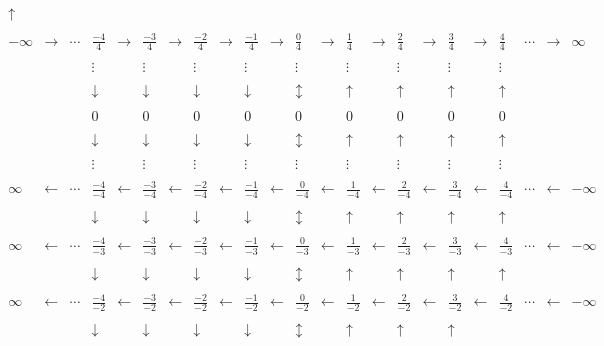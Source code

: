 \documentclass [12pt]{book}
\begin{document}
\begin{eqnarray}
\begin{array}{rrrrrrrrrrrrrrrrrrrrrrrrrrrrrrrrrrrrrrrrrrrrrrrrrrrrrrrrrrrrrrrrrrrrrrrrrrrrrrrr}
\uparrow&&& \\\\-\infty&\rightarrow&\cdots & \frac{-4}{4}&\rightarrow & \frac{-3}{4}&\rightarrow  & \frac{-2}{4}&\rightarrow  & \frac{-1}{4}&\rightarrow  & \frac{0}{4}&\rightarrow   & \frac{1}{4} &\rightarrow & \frac{2}{4}&\rightarrow  & \frac{3}{4}&\rightarrow  & \frac{4}{4} &\cdots&\rightarrow &\infty
\\\\&&&\vdots & &\vdots & & \vdots & & \vdots  && \vdots  && \vdots && \vdots && \vdots && \vdots & & &\\\\&&&\downarrow&& \downarrow&&\downarrow&& \downarrow&&\updownarrow&&\uparrow &&\uparrow&&\uparrow&&
\uparrow&&& \\\\
&&& 0&& 0&& 0&& 0&& 0 && 0&& 0&&0&&0&&&\\\\&&&\downarrow&& \downarrow&&\downarrow&& \downarrow&&\updownarrow&&\uparrow &&\uparrow&&\uparrow&&
\uparrow&&&\\\\&&&\vdots & &\vdots & & \vdots & & \vdots  && \vdots && \vdots && \vdots && \vdots && \vdots & & &\\\\\infty&\leftarrow&\cdots & \frac{-4}{-4}&\leftarrow & \frac{-3}{-4}&\leftarrow  & \frac{-2}{-4}&\leftarrow  & \frac{-1}{-4}&\leftarrow  & \frac{0}{-4}&\leftarrow   & \frac{1}{-4} &\leftarrow & \frac{2}{-4}&\leftarrow  & \frac{3}{-4}&\leftarrow  & \frac{4}{-4} &\cdots&\leftarrow &-\infty\\\\&&&\downarrow&& \downarrow&&\downarrow&& \downarrow&&\updownarrow&&\uparrow &&\uparrow&&\uparrow&&
\uparrow&&&\\\\\infty&\leftarrow&\cdots & \frac{-4}{-3}&\leftarrow & \frac{-3}{-3}&\leftarrow  & \frac{-2}{-3}&\leftarrow  & \frac{-1}{-3}&\leftarrow  & \frac{0}{-3}&\leftarrow   & \frac{1}{-3} &\leftarrow & \frac{2}{-3}&\leftarrow  & \frac{3}{-3}&\leftarrow  & \frac{4}{-3} &\cdots&\leftarrow &-\infty\\\\&&&\downarrow&& \downarrow&&\downarrow&& \downarrow&&\updownarrow&&\uparrow &&\uparrow&&\uparrow&&
\uparrow&&& \\\\\infty&\leftarrow&\cdots & \frac{-4}{-2}&\leftarrow & \frac{-3}{-2}&\leftarrow  & \frac{-2}{-2}&\leftarrow  & \frac{-1}{-2}&\leftarrow  & \frac{0}{-2}&\leftarrow   & \frac{1}{-2} &\leftarrow & \frac{2}{-2}&\leftarrow  & \frac{3}{-2}&\leftarrow  & \frac{4}{-2} &\cdots&\leftarrow &-\infty\\\\&&&\downarrow&& \downarrow&&\downarrow&& \downarrow&&\updownarrow&&\uparrow &&\uparrow&&\uparrow&&

\end{array}
\end{eqnarray}
\end{document}
